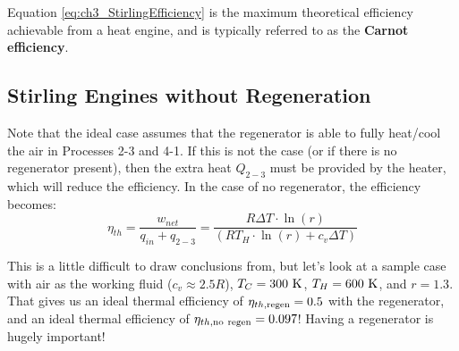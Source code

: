 Equation \ref{eq:ch3_StirlingEfficiency} is the maximum theoretical efficiency achievable from a heat engine, and is typically referred to as the {\bf Carnot efficiency}.

\subsection{Stirling Engines without Regeneration}
Note that the ideal case assumes that the regenerator is able to fully heat/cool the air in Processes 2-3 and 4-1.  If this is not the case (or if there is no regenerator present), then the extra heat $Q_{2-3}$ must be provided by the heater, which will reduce the efficiency.  In the case of no regenerator, the efficiency becomes:
\begin{equation} \label{eq:ch3_StirlingEfficiencyNoRegen}
  \nonumber \eta_{th} = \frac{w_{net}}{q_{in} + q_{2-3}} = \frac{R\Delta T\cdot \ln (r)}{(RT_H\cdot \ln(r)+c_v\Delta T)}
\end{equation}

This is a little difficult to draw conclusions from, but let's look at a sample case with air as the working fluid ($c_v \approx 2.5 R$), $T_C = 300\ {\rm K}$, $T_H = 600\ {\rm K}$, and $r = 1.3$.  That gives us an ideal thermal efficiency of $\eta_{th, {\rm regen}} = 0.5$ with the regenerator, and an ideal thermal efficiency of $\eta_{th, {\rm no\ regen}} = 0.097$!  Having a regenerator is hugely important!

